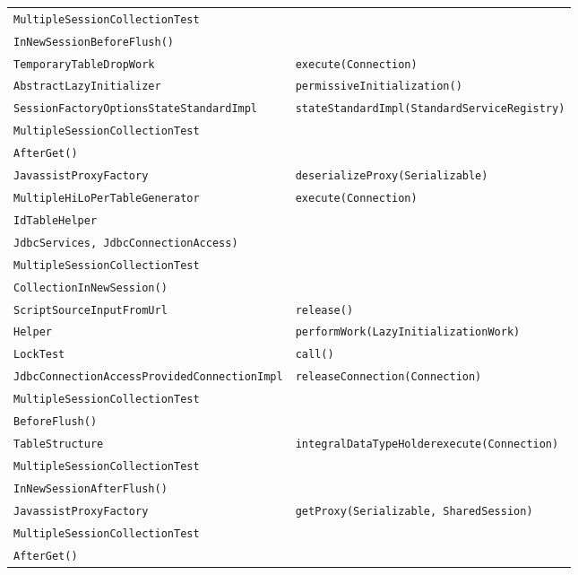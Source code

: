 \begin{center}
\begin{longtable}{ll}
\lstinline/MultipleSessionCollectionTest/&\raisebox{-13pt}{\shortstack{\lstinline/testSaveOrUpdateOwnerWithCollection/-\\\lstinline/InNewSessionBeforeFlush()/}}\\
\lstinline/TemporaryTableDropWork/&{\lstinline/execute(Connection)/}\\
\lstinline/AbstractLazyInitializer/&{\lstinline/permissiveInitialization()/}\\
\lstinline/SessionFactoryOptionsStateStandardImpl/&{\lstinline/stateStandardImpl(StandardServiceRegistry)/}\\
\lstinline/MultipleSessionCollectionTest/&\raisebox{-13pt}{\shortstack{\lstinline/testCopyInitializedCollectionReference/-\\\lstinline/AfterGet()/}}\\
\lstinline/JavassistProxyFactory/&{\lstinline/deserializeProxy(Serializable)/}\\
\lstinline/MultipleHiLoPerTableGenerator/&{\lstinline/execute(Connection)/}\\
\lstinline/IdTableHelper/&\raisebox{-13pt}{\shortstack{\lstinline/executeIdTableDropStatements(String[],/\\\lstinline/JdbcServices, JdbcConnectionAccess)/}}\\
\lstinline/MultipleSessionCollectionTest/&\raisebox{-13pt}{\shortstack{\lstinline/testSaveOrUpdateOwnerWithUninitialized/-\\\lstinline/CollectionInNewSession()/}}\\
\lstinline/ScriptSourceInputFromUrl/&{\lstinline/release()/}\\
\lstinline/Helper/&{\lstinline/performWork(LazyInitializationWork)/}\\
\lstinline/LockTest/&{\lstinline/call()/}\\
\lstinline/JdbcConnectionAccessProvidedConnectionImpl/&{\lstinline/releaseConnection(Connection)/}\\
\lstinline/MultipleSessionCollectionTest/&\raisebox{-13pt}{\shortstack{\lstinline/testCopyPersistentCollectionReference/-\\\lstinline/BeforeFlush()/}}\\
\lstinline/TableStructure/&{\lstinline/integralDataTypeHolderexecute(Connection)/}\\
\lstinline/MultipleSessionCollectionTest/&\raisebox{-13pt}{\shortstack{\lstinline/testSaveOrUpdateOwnerWithCollection/-\\\lstinline/InNewSessionAfterFlush()/}}\\
\lstinline/JavassistProxyFactory/&{\lstinline/getProxy(Serializable, SharedSession)/}\\
\lstinline/MultipleSessionCollectionTest/&\raisebox{-13pt}{\shortstack{\lstinline/testCopyUninitializedCollectionReference/-\\\lstinline/AfterGet()/}}\\
\end{longtable}
\end{center}

